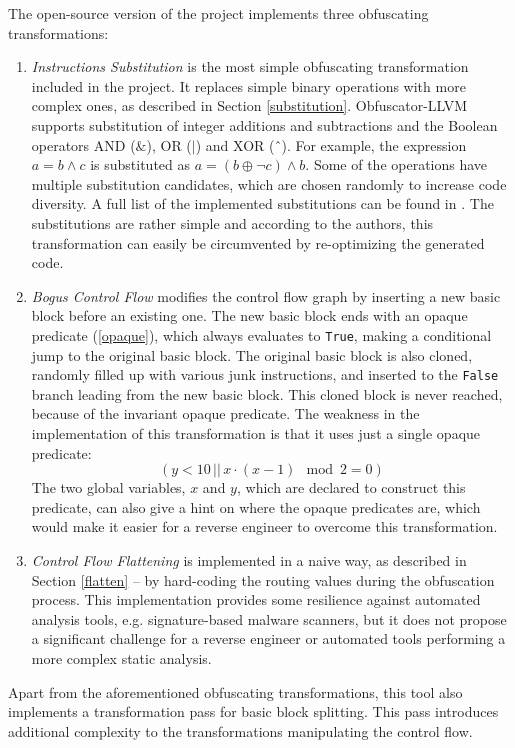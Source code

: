 \documentclass[
  digital, %
  notable,   %
  twoside, %
  nolof,     %
  nolot,     %
]{fithesis3}
\theoremstyle{definition}
\begin{document}
The open-source version of the project implements three obfuscating transformations:
\begin{enumerate}
    \item \textit{Instructions Substitution} is the most simple obfuscating transformation included in the project. It replaces simple binary operations with more complex ones, as described in Section \ref{substitution}. Obfuscator-LLVM supports substitution of integer additions and subtractions and the Boolean operators  AND  ($\&$),  OR  ($|$)  and  XOR  (ˆ). For example, the expression $a = b \wedge c$ is substituted as $a = (b \oplus \neg c) \wedge b$. Some of the operations have multiple substitution candidates, which are chosen randomly to increase code diversity. A full list of the implemented substitutions can be found in \cite{obfuscator-llvm}. The substitutions are rather simple and according to the authors, this transformation  can easily  be  circumvented  by  re-optimizing  the  generated  code.
    \item \textit{Bogus Control Flow} modifies the control flow graph by inserting a new basic block before an existing one. The new basic block ends with an opaque predicate (\ref{opaque}), which always evaluates to \texttt{True}, making a conditional jump to the original basic block. The original basic block is also cloned, randomly filled up with various junk instructions, and inserted to the \texttt{False} branch leading from the new basic block. This cloned block is never reached, because of the invariant opaque predicate. The weakness in the implementation of this transformation is that it uses just a single opaque predicate: $$(y < 10\, ||\, x \cdot (x - 1) \mod 2 = 0)$$ The two global variables, $x$ and $y$, which are declared to construct this predicate, can also give a hint on where the opaque predicates are, which would make it easier for a reverse engineer to overcome this transformation. 
    \item \textit{Control Flow Flattening} is implemented in a naive way, as described in Section \ref{flatten} -- by hard-coding the routing values during the obfuscation process. This implementation provides some resilience against automated analysis tools, e.g. signature-based malware scanners, but it does not propose a significant challenge for a reverse engineer or automated tools performing a more complex static analysis.
\end{enumerate}

Apart from the aforementioned obfuscating transformations, this tool also implements a transformation pass for basic block splitting. This pass introduces additional complexity to the transformations manipulating the control flow. 
\end{document}
